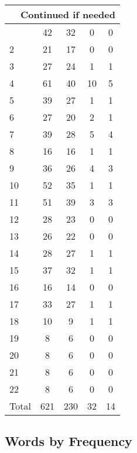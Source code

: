 \begin{center}
\begin{longtable}{l|c|c|c|c}
\hline \multicolumn{5}{|r|}{{Continued if needed}} \\ \hline
\endfoot 
1 & 42 & 32 & 0 & 0\\ \hline
2 & 21 & 17 & 0 & 0\\ \hline
3 & 27 & 24 & 1 & 1\\ \hline
4 & 61 & 40 & 10 & 5\\ \hline
5 & 39 & 27 & 1 & 1\\ \hline
6 & 27 & 20 & 2 & 1\\ \hline
7 & 39 & 28 & 5 & 4\\ \hline
8 & 16 & 16 & 1 & 1\\ \hline
9 & 36 & 26 & 4 & 3\\ \hline
10 & 52 & 35 & 1 & 1\\ \hline
11 & 51 & 39 & 3 & 3\\ \hline
12 & 28 & 23 & 0 & 0\\ \hline
13 & 26 & 22 & 0 & 0\\ \hline
14 & 28 & 27 & 1 & 1\\ \hline
15 & 37 & 32 & 1 & 1\\ \hline
16 & 16 & 14 & 0 & 0\\ \hline
17 & 33 & 27 & 1 & 1\\ \hline
18 & 10 & 9 & 1 & 1\\ \hline
19 & 8 & 6 & 0 & 0\\ \hline
20 & 8 & 6 & 0 & 0\\ \hline
21 & 8 & 6 & 0 & 0\\ \hline
22 & 8 & 6 & 0 & 0\\ \hline
\hline \hline
Total & 621 & 230 & 32 & 14



\end{longtable}
\end{center}

 
\subsection{Words by Frequency}

